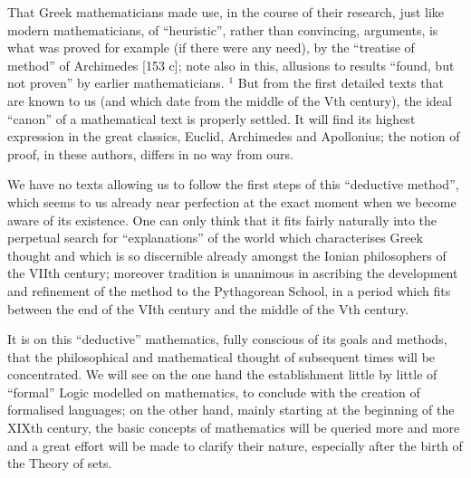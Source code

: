 That Greek mathematicians made use, in the course of their research, just like modern mathematicians, of ``heuristic'', rather than convincing, arguments, is what was proved for example (if there were any need), by the ``treatise of method'' of Archimedes {[}153 c{]}; note also in this, allusions to results ``found, but not proven'' by earlier mathematicians. \(^{1}\) But from the first detailed texts that are known to us (and which date from the middle of the Vth century), the ideal ``canon'' of a mathematical text is properly settled. It will find its highest expression in the great classics, Euclid, Archimedes and Apollonius; the notion of proof, in these authors, differs in no way from ours.

We have no texts allowing us to follow the first steps of this ``deductive method'', which seems to us already near perfection at the exact moment when we become aware of its existence. One can only think that it fits fairly naturally into the perpetual search for ``explanations'' of the world which characterises Greek thought and which is so discernible already amongst the Ionian philosophers of the VIIth century; moreover tradition is unanimous in ascribing the development and refinement of the method to the Pythagorean School, in a period which fits between the end of the VIth century and the middle of the Vth century.

It is on this ``deductive'' mathematics, fully conscious of its goals and methods, that the philosophical and mathematical thought of subsequent times will be concentrated. We will see on the one hand the establishment little by little of ``formal'' Logic modelled on mathematics, to conclude with the creation of formalised languages; on the other hand, mainly starting at the beginning of the XIXth century, the basic concepts of mathematics will be queried more and more and a great effort will be made to clarify their nature, especially after the birth of the Theory of sets.

